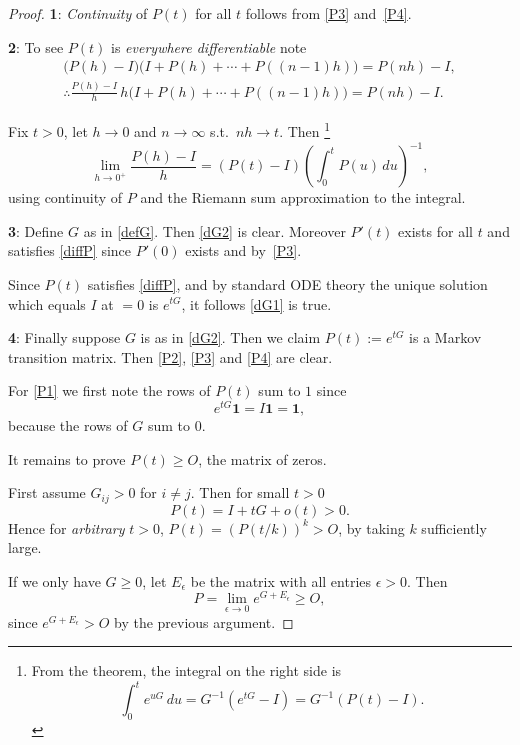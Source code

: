 \documentclass[a4paper]{amsart}
\theoremstyle{plain}
\theoremstyle{definition}
\theoremstyle{remark}
\begin{document}
\begin{proof}\mbox{}

\textbf{1}: \emph{Continuity} of $ P(t) $ for all $ t $ follows from \eqref{P3} and~\eqref{P4}.

\medskip
\textbf{2}: To see $ P(t) $ is \emph{everywhere differentiable} note
\begin{gather*}
 \big(P(h)-I\big)\big( I + P(h) + \cdots + P((n-1)h)\big) = P(nh) - I,\\
 \therefore \frac{P(h)-I}{h}\, h \big( I + P(h) + \cdots + P((n-1)h)\big)  =  P(nh) - I.
 \end{gather*}
 
 Fix $ t>0 $, let $ h \to 0 $ and $ n\to \infty $ s.t.\ $ nh \to t $.
Then%
\footnote{From the theorem, the integral on the right side is
\[   \int_0^t e^{uG}\, du = G^{-1} (e^{tG}-I) = G^{-1} (P(t) - I).
\]
}
\[
\lim_{h\to 0^+}  \frac{P(h)-I}{h}  = (P(t) - I) \left( \int_0^t P(u)\, du\right)^{-1},
\]
using continuity of $ P $ and the Riemann sum approximation to the integral.

\medskip \textbf{3}:  Define $ G $ as in \eqref{defG}.  Then \eqref{dG2} is clear. Moreover $ P'(t) $ exists for all $ t $ and satisfies \eqref{diffP} since  $ P'(0) $ exists and by~\eqref{P3}. 

Since $ P(t) $ satisfies \eqref{diffP}, and by standard ODE theory the unique solution which equals $ I $ at $ =0 $ is  $ e^{tG} $, it follows \eqref{dG1} is true.  

\medskip
\textbf{4}: Finally suppose $ G $ is as in  \eqref{dG2}.  Then we claim $ P(t) := e^{tG} $ is a Markov transition matrix.  Then \eqref{P2}, \eqref{P3} and \eqref{P4} are clear.  

For \eqref{P1}  we first note the rows of $ P(t) $ sum to $ 1 $ since
\[
e^{tG} \boldsymbol{1} = I \boldsymbol{1} = \boldsymbol{1},
\]
because the rows of $ G$  sum to $ 0 $.

It remains to prove $ P(t) \geq O$, the matrix of zeros. 

First assume $ G_{ij}>0 $ for $ i\neq j $.  Then
for small $ t> 0 $ 
\[
P(t) =  I + t G + o(t) >0.
\]
Hence for \emph{arbitrary}  $ t>0 $, $ P(t) = (P(t/k))^k >O$, by taking  $ k $ sufficiently large.

If we only have $ G \geq 0 $, let $E_{\epsilon}   $ be the matrix with all entries $ \epsilon > 0 $. Then 
\[  P = \lim_{\epsilon \to 0} e^{G + E_{\epsilon} } \geq O, \] 
since $ e^{G + E_{\epsilon} } > O$ by the previous argument.
\end{proof} 
\end{document}
